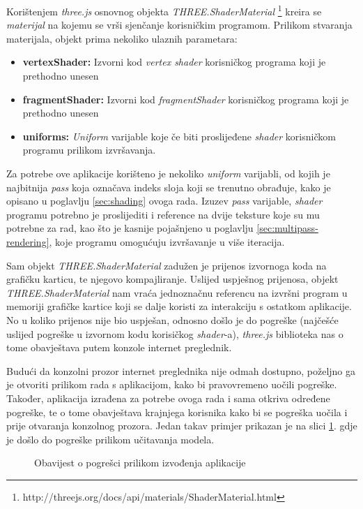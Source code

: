 Korištenjem \emph{three.js} osnovnog objekta \emph{THREE.ShaderMaterial} \footnote{http://threejs.org/docs/api/materials/ShaderMaterial.html} kreira se \emph{materijal} na kojemu se vrši sjenčanje korisničkim programom. Prilikom stvaranja materijala, objekt prima nekoliko ulaznih parametara:

\begin{itemize}
\item \textbf{vertexShader:} Izvorni kod \emph{vertex shader} korisničkog programa koji je prethodno unesen
\item \textbf{fragmentShader:} Izvorni kod \emph{fragmentShader} korisničkog programa koji je prethodno unesen
\item \textbf{uniforms:} \emph{Uniform} varijable koje če biti proslijeđene \emph{shader} korisničkom programu prilikom izvršavanja.
\end{itemize}

Za potrebe ove aplikacije korišteno je nekoliko \emph{uniform} varijabli, od kojih je najbitnija \emph{pass} koja označava indeks sloja koji se trenutno obrađuje, kako je opisano u poglavlju \ref{sec:shading} ovoga rada. Izuzev \emph{pass} varijable, \emph{shader} programu potrebno je proslijediti i reference na dvije teksture koje su mu potrebne za rad, kao što je kasnije pojašnjeno u poglavlju \ref{sec:multipass-rendering}, koje programu omogućuju izvršavanje u više iteracija.

Sam objekt \emph{THREE.ShaderMaterial} zadužen je prijenos izvornoga koda na grafičku karticu, te njegovo kompajliranje. Uslijed uspješnog prijenosa, objekt \emph{THREE.ShaderMaterial} nam vraća jednoznačnu referencu na izvršni program u memoriji grafičke kartice koji se dalje koristi za interakciju s ostatkom aplikacije. No u koliko prijenos nije bio uspješan, odnosno došlo je do pogreške (najčešće uslijed pogreške u izvornom kodu korisičkog \emph{shader}-a), \emph{three.js} biblioteka nas o tome obavještava putem konzole internet preglednik.

Budući da konzolni prozor internet preglednika nije odmah dostupno, poželjno ga je otvoriti prilikom rada s aplikacijom, kako bi pravovremeno uočili pogreške. Također, aplikacija izrađena za potrebe ovoga rada i sama otkriva određene pogreške, te o tome obavještava krajnjega korisnika kako bi se pogreška uočila i prije otvaranja konzolnog prozora. Jedan takav primjer prikazan je na slici \ref{fig:interface-error}. gdje je došlo do pogreške prilikom učitavanja modela.

\begin{figure}[H]
\centering{}
\caption{Obavijest o pogrešci prilikom izvođenja aplikacije}
\label{fig:interface-error}
\end{figure}

